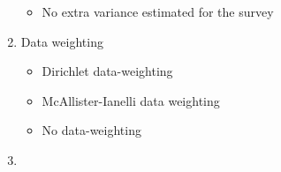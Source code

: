 \documentclass[11pt,
  english,
  a4paper,
]{article}
\begin{document}
\begin{enumerate}
\begin{itemize}
    \tagmcend\tagstructend\tagstructend
  \item


    No extra variance estimated for the survey

    \tagmcend\tagstructend\tagstructend

    \tagmcend\tagstructend\tagstructend
  \end{itemize}

  \tagstructend
\item

  Data weighting

  \tagmcend\tagstructend\tagstructend


  \begin{itemize}
  \item


    Dirichlet data-weighting

    \tagmcend\tagstructend\tagstructend

    \tagmcend\tagstructend\tagstructend
  \item


    McAllister-Ianelli data weighting

    \tagmcend\tagstructend\tagstructend

    \tagmcend\tagstructend\tagstructend
  \item


    No data-weighting

    \tagmcend\tagstructend\tagstructend

    \tagmcend\tagstructend\tagstructend
  \end{itemize}

  \tagstructend
\item


\end{enumerate}
\end{document}
